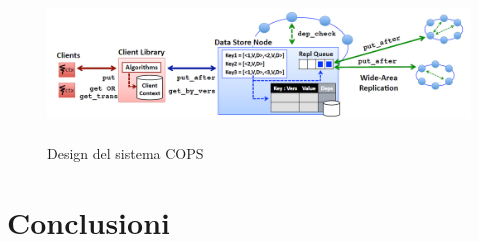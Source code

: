 \documentclass[twoside]{article}
\begin{document}
\begin{multicols}{2}
\begin{figure}[t]
\centering
\includegraphics[width=\textwidth,height=4cm]{img/COPSdesign.png}
\caption{Design del sistema COPS}
\label{fig:COPSdesign}
\end{figure}

\section{Conclusioni}
\label{sec:conclusioni}


 

\printbibliography


\end{multicols}
\end{document}
